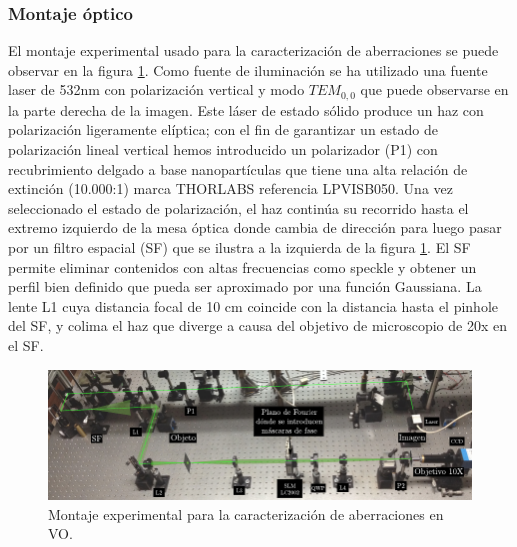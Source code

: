 \subsubsection{Montaje óptico} 
El montaje experimental usado para la caracterización de aberraciones
se puede observar en la figura \ref{fig:exp_setup}. Como fuente de
iluminación se ha utilizado una fuente laser de 532nm con polarización
vertical y modo $TEM_{0,0}$ que puede observarse en la parte derecha de la imagen. Este
láser de estado sólido produce un haz con polarización ligeramente
elíptica; con el fin de garantizar un estado de polarización lineal
vertical hemos introducido un polarizador (P1) con recubrimiento delgado a
base nanopartículas que tiene una alta relación de
extinción (10.000:1) marca THORLABS referencia LPVISB050. Una vez
seleccionado el estado de polarización, el haz continúa su recorrido 
hasta el extremo izquierdo de la mesa óptica donde cambia de dirección
para luego pasar por un filtro espacial (SF) que se ilustra a la izquierda
de la figura \ref{fig:exp_setup}. El SF permite eliminar
contenidos con altas frecuencias como speckle y obtener un perfil
 bien definido que pueda ser aproximado por una función Gaussiana. La
 lente L1 cuya distancia focal de 10 cm coincide con la distancia hasta
 el pinhole del SF, y colima el haz que diverge a causa del
 objetivo de microscopio de 20x en el SF. 

\begin{figure}[h!]
\centering
\includegraphics[scale=1]{PD_setup_big.pdf}
\caption[Montaje experimental para reconstrucción de fase con PD]{Montaje experimental para la caracterización de aberraciones
en VO.} 
\label{fig:exp_setup}
\end{figure} 


